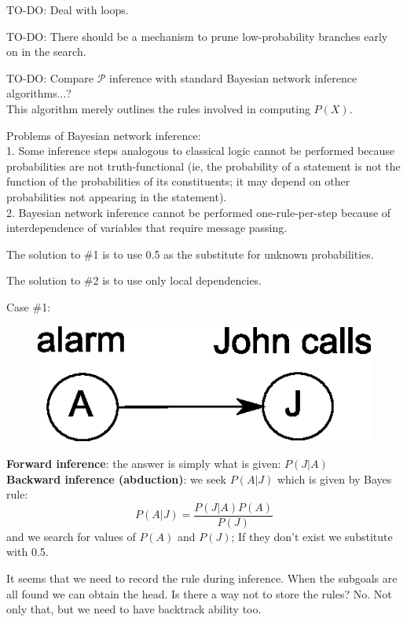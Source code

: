 TO-DO: Deal with loops.

TO-DO: There should be a mechanism to prune low-probability branches early on in the search.

TO-DO: Compare $\mathcal{P}$ inference with standard Bayesian network inference algorithms...?\\
This algorithm merely outlines the rules involved in computing $P(X)$.

Problems of Bayesian network inference:\\
1.  Some inference steps analogous to classical logic cannot be performed because probabilities are not truth-functional (ie, the probability of a statement is not the function of the probabilities of its constituents; it may depend on other probabilities not appearing in the statement).\\
2.  Bayesian network inference cannot be performed one-rule-per-step because of interdependence of variables that require message passing.

The solution to \#1 is to use 0.5 as the substitute for unknown probabilities.

The solution to \#2 is to use only local dependencies.

Case \#1:
\begin{figure}[H]
\centering
\includegraphics{BayesNet-alarm-John.eps}
\end{figure}
\textbf{Forward inference}: the answer is simply what is given: $P(J|A)$\\
\textbf{Backward inference (abduction)}: we seek $P(A|J)$ which is given by Bayes rule:\\
$$ P(A|J) = \frac{P(J|A)P(A)}{P(J)} $$
and we search for values of $P(A)$ and $P(J)$; If they don't exist we substitute with 0.5.

It seems that we need to record the rule during inference.  When the subgoals are all found we can obtain the head.  Is there a way not to store the rules?  No.  Not only that, but we need to have backtrack ability too.

